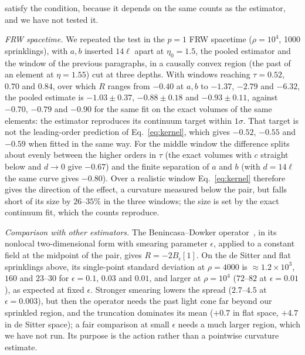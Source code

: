 \documentclass[prd,twocolumn,superscriptaddress,nofootinbib,amsmath,amssymb,floatfix]{revtex4-2}
\begin{document}
satisfy the condition, because it depends on the same counts as the estimator, and we have not tested it.

\emph{FRW spacetime.} We repeated the test in the $p=1$ FRW spacetime ($\rho=10^4$, 1000 sprinklings), with $a,b$ inserted $14\ell$ apart at $\eta_0=1.5$, the pooled estimator and the window of the previous paragraphs, in a causally convex region (the past of an element at $\eta=1.55$) cut at three depths. With windows reaching $\tau=0.52$, $0.70$ and $0.84$, over which $R$ ranges from $-0.40$ at $a,b$ to $-1.37$, $-2.79$ and $-6.32$, the pooled estimate is $-1.03\pm0.37$, $-0.88\pm0.18$ and $-0.93\pm0.11$, against $-0.70$, $-0.79$ and $-0.90$ for the same fit on the exact volumes of the same elements: the estimator reproduces its continuum target within $1\sigma$. That target is not the leading-order prediction of Eq.~\eqref{eq:kernel}, which gives $-0.52$, $-0.55$ and $-0.59$ when fitted in the same way. For the middle window the difference splits about evenly between the higher orders in $\tau$ (the exact volumes with $c$ straight below and $d\to0$ give $-0.67$) and the finite separation of $a$ and $b$ (with $d=14\ell$ the same curve gives $-0.80$). Over a realistic window Eq.~\eqref{eq:kernel} therefore gives the direction of the effect, a curvature measured below the pair, but falls short of its size by $26$--$35\%$ in the three windows; the size is set by the exact continuum fit, which the counts reproduce.

\emph{Comparison with other estimators.} The Benincasa--Dowker operator~\cite{BD10}, in its nonlocal two-dimensional form with smearing parameter $\epsilon$, applied to a constant field at the midpoint of the pair, gives $R=-2B_\epsilon[1]$. On the de Sitter and flat sprinklings above, its single-point standard deviation at $\rho=4000$ is $\approx1.2\times10^3$, $160$ and $23$--$30$ for $\epsilon=0.1$, $0.03$ and $0.01$, and larger at $\rho=10^4$ ($72$--$82$ at $\epsilon=0.01$), as expected at fixed $\epsilon$. Stronger smearing lowers the spread ($2.7$--$4.5$ at $\epsilon=0.003$), but then the operator needs the past light cone far beyond our sprinkled region, and the truncation dominates its mean ($+0.7$ in flat space, $+4.7$ in de Sitter space); a fair comparison at small $\epsilon$ needs a much larger region, which we have not run. Its purpose is the action rather than a pointwise curvature estimate.
\end{document}
